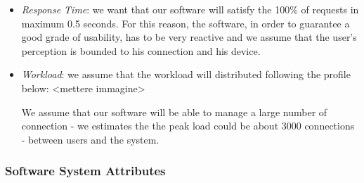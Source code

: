 \documentclass[english]{article}
\begin{document}
\begin{itemize}

  \item{\textit{Response Time}: we want that our software will satisfy the 100\% of requests in maximum 0.5 seconds.
  For this reason, the software, in order to guarantee a good grade of usability, has to be very reactive
  and we assume that the user's perception is bounded to his connection and his device.}

  \item{\textit{Workload}: we assume that the workload will distributed following the profile below: <mettere immagine>\newline

  We assume that our software will be able to manage a large number of connection
  - we estimates the the peak load could be about 3000 connections - between users and the system.}
\end{itemize}

\subsubsection{Software System Attributes}
\end{document}
